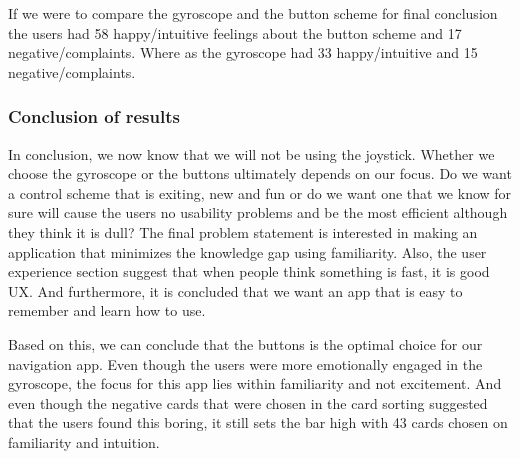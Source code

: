 If we were to compare the gyroscope and the button scheme for final conclusion the users had 58 happy/intuitive feelings about the button scheme and 17 negative/complaints. Where as the gyroscope had 33 happy/intuitive and 15 negative/complaints. 

\subsubsection{Conclusion of results}

In conclusion, we now know that we will not be using the joystick. Whether we choose the gyroscope or the buttons ultimately depends on our focus. Do we want a control scheme that is exiting, new and fun or do we want one that we know for sure will cause the users no usability problems and be the most efficient although they think it is dull? 
The final problem statement is interested in making an application that minimizes the knowledge gap using familiarity. %
Also, the user experience section suggest that when people think something is fast, it is good UX. \pageref{EvalConFast} And furthermore, it is concluded that we want an app that is easy to remember and learn how to use. \pageref{EvalConUsability}

Based on this, we can conclude that the buttons is the optimal choice for our navigation app. Even though the users were more emotionally engaged in the gyroscope, the focus for this app lies within familiarity and not excitement. And even though the negative cards that were chosen in the card sorting suggested that the users found this boring, it still sets the bar high with 43 cards chosen on familiarity and intuition.
 

